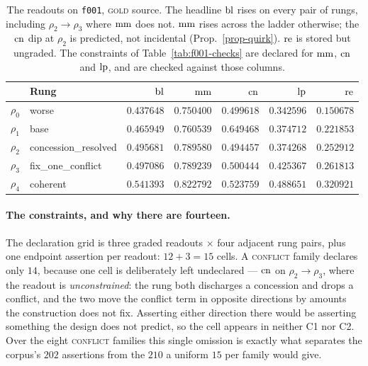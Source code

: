 \begin{table}[htbp]
\centering\small
\caption{The readouts on \texttt{f001}, \textsc{gold} source. The headline $\mathrm{bl}$ rises on every pair
  of rungs, including $\rho_2\to\rho_3$ where $\mathrm{mm}$ does not. $\mathrm{mm}$ rises across the ladder otherwise;
  the $\mathrm{cn}$ dip at $\rho_2$ is predicted, not incidental (Prop.~\ref{prop-quirk}). $\mathrm{re}$ is stored
  but ungraded. The constraints of Table~\ref{tab:f001-checks} are declared for $\mathrm{mm}$, $\mathrm{cn}$ and
  $\mathrm{lp}$, and are checked against those columns.}
\label{tab:f001-scores}
\begin{tabular}{@{}llrrrrr@{}}
\toprule
& Rung & $\mathrm{bl}$ & $\mathrm{mm}$ & $\mathrm{cn}$ & $\mathrm{lp}$ & $\mathrm{re}$ \\
\midrule
$\rho_0$ & \textsf{worse}               & $0.437648$ & $0.750400$ & $0.499618$ & $0.342596$ & $0.150678$ \\
$\rho_1$ & \textsf{base}                & $0.465949$ & $0.760539$ & $0.649468$ & $0.374712$ & $0.221853$ \\
$\rho_2$ & \textsf{concession\_resolved} & $0.495681$ & $0.789580$ & $0.494457$ & $0.374268$ & $0.252912$ \\
$\rho_3$ & \textsf{fix\_one\_conflict}   & $0.497086$ & $0.789239$ & $0.500444$ & $0.425367$ & $0.261813$ \\
$\rho_4$ & \textsf{coherent}            & $0.541393$ & $0.822792$ & $0.523759$ & $0.488651$ & $0.320921$ \\
\bottomrule
\end{tabular}
\end{table}

\paragraph{The constraints, and why there are fourteen.} The declaration grid is three graded readouts
$\times$ four adjacent rung pairs, plus one endpoint assertion per readout: $12 + 3 = 15$ cells. A
\textsc{conflict} family declares only $14$, because one cell is deliberately left undeclared ---
$\mathrm{cn}$ on $\rho_2 \to \rho_3$, where the readout is \emph{unconstrained}: the rung both discharges a
concession and drops a conflict, and the two move the conflict term in opposite directions by amounts
the construction does not fix. Asserting either direction there would be asserting something the design
does not predict, so the cell appears in neither C1 nor C2. Over the eight \textsc{conflict} families
this single omission is exactly what separates the corpus's $202$ assertions from the $210$ a uniform
$15$ per family would give.

